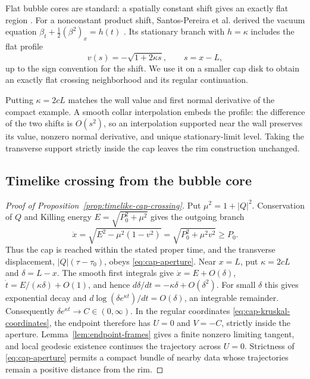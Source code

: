 \documentclass[10pt]{article}
\begin{document}
Flat bubble cores are standard: a spatially constant shift gives an
exactly flat region \cite[Corollary~1.6]{Natario2002}.  For a nonconstant
product shift, Santos-Pereira et al. derived the vacuum equation
\(\beta_t+\tfrac12(\beta^2)_x=h(t)\)
\cite[Eq.~(4.12)]{SantosPereiraEtAl2020}.  Its stationary branch with
\(h=\kappa\) includes the flat profile
\begin{equation}
  v(s)=-\sqrt{1+2\kappa s},\qquad s=x-L,
  \label{eq:flat-cap-germ}
\end{equation}
up to the sign convention for the shift.  We use it on a smaller cap disk
to obtain an exactly flat crossing neighborhood and its regular continuation.

Putting \(\kappa=2cL\) matches the wall value and first normal derivative
of the compact example.  A smooth collar interpolation embeds the profile:
the difference of the two shifts is \(O(s^2)\), so an interpolation supported
near the wall preserves its value, nonzero normal derivative, and unique
stationary-limit level.  Taking the transverse support strictly inside the
cap leaves the rim construction unchanged.

\subsection{Timelike crossing from the bubble core}
\label{app:timelike-crossing}

\begin{proof}[Proof of Proposition~\ref{prop:timelike-cap-crossing}]
Put \(\mu^2=1+|Q|^2\).  Conservation of \(Q\) and Killing energy
\(E=\sqrt{P_0^2+\mu^2}\) gives the outgoing branch
\begin{equation}
  \dot x=\sqrt{E^2-\mu^2(1-v^2)}
        =\sqrt{P_0^2+\mu^2v^2}\geq P_0.
  \label{eq:cap-timelike-velocity}
\end{equation}
Thus the cap is reached within the stated proper time, and the transverse
displacement, \(|Q|(\tau-\tau_0)\), obeys \eqref{eq:cap-aperture}.
Near \(x=L\), put \(\kappa=2cL\) and \(\delta=L-x\).
The smooth first integrals give \(\dot x=E+O(\delta)\),
\(\dot t=E/(\kappa\delta)+O(1)\), and hence
\(d\delta/dt=-\kappa\delta+O(\delta^2)\).
For small \(\delta\) this gives exponential decay and
\(d\log(\delta e^{\kappa t})/dt=O(\delta)\), an integrable remainder.
Consequently \(\delta e^{\kappa t}\to C\in(0,\infty)\).
In the regular coordinates \eqref{eq:cap-kruskal-coordinates}, the endpoint
therefore has \(U=0\) and \(V=-C\), strictly inside the aperture.
Lemma~\ref{lem:endpoint-frames} gives a finite nonzero limiting tangent, and
local geodesic existence continues the trajectory across \(U=0\).
Strictness of \eqref{eq:cap-aperture} permits a compact bundle of nearby data
whose trajectories remain a positive distance from the rim.
\end{proof}
\end{document}
